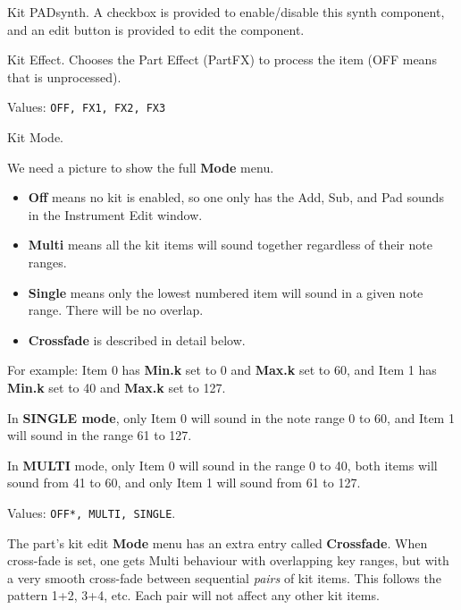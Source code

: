    Kit PADsynth.
   A checkbox is provided to enable/disable this synth component, and
   an edit button is provided to edit the component.

   Kit Effect.
   Chooses the Part Effect (PartFX) to process the item (OFF means that is
   unprocessed). 

   Values: \texttt{OFF, FX1, FX2, FX3}

   Kit Mode.

   We need a picture to show the full \textbf{Mode} menu.

   \begin{itemize}
      \item \textbf{Off} means no kit is enabled, so one only has the Add,
         Sub, and Pad sounds in the Instrument Edit window.
      \item \textbf{Multi} means all the kit items will sound together
         regardless of their note ranges.
      \item \textbf{Single} means only the lowest numbered item will sound
         in a given note range. There will be no overlap.
      \item \textbf{Crossfade} is described in detail below.
   \end{itemize}

   For example:
   Item 0 has \textbf{Min.k} set to 0 and \textbf{Max.k} set to 60, and
   Item 1 has \textbf{Min.k} set to 40 and \textbf{Max.k} set to 127.

   In \textbf{SINGLE mode}, only Item 0 will sound in the note range 0 to
   60, and Item 1 will sound in the range 61 to 127.

   In \textbf{MULTI} mode, only Item 0 will sound in the range 0 to 40, both
   items will sound from 41 to 60, and only Item 1 will sound from 61 to
   127.

   Values: \texttt{OFF*, MULTI, SINGLE}.

   The part's kit edit \textbf{Mode} menu has an extra entry
   called \textbf{Crossfade}.
   When cross-fade is set, one gets Multi behaviour with overlapping key
   ranges, but with a very smooth cross-fade between sequential \textsl{pairs}
   of kit items. This follows the pattern 1+2, 3+4, etc. Each pair will not
   affect any other kit items.

